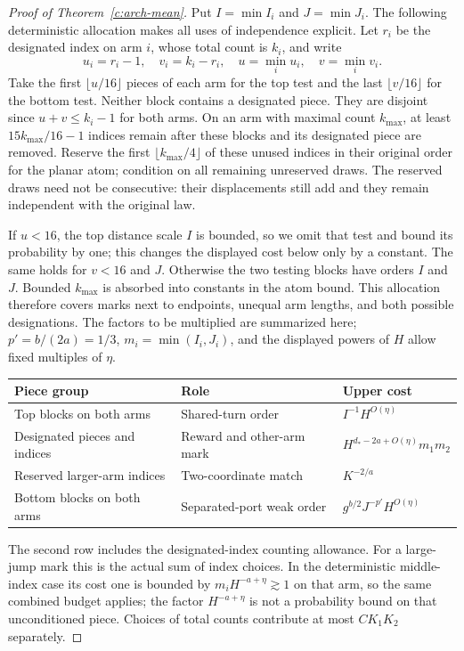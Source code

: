 \documentclass[11pt]{article}
\numberwithin{equation}{section}
\theoremstyle{definition}\newtheorem{definition}[theorem]{Definition}
\theoremstyle{remark}\newtheorem{remark}[theorem]{Remark}
\begin{document}
\begin{proof}[Proof of Theorem~\ref{c:arch-mean}]
Put $I=\min I_i$ and $J=\min J_i$. The following deterministic allocation makes all uses of independence explicit. Let $r_i$ be the designated index on arm $i$, whose total count is $k_i$, and write
\[
 u_i=r_i-1,\quad v_i=k_i-r_i,\quad
 u=\min_i u_i,\quad v=\min_i v_i.
\]
Take the first $\lfloor u/16\rfloor$ pieces of each arm for the top test and the last $\lfloor v/16\rfloor$ for the bottom test. Neither block contains a designated piece. They are disjoint since $u+v\le k_i-1$ for both arms. On an arm with maximal count $k_{\max}$, at least $15k_{\max}/16-1$ indices remain after these blocks and its designated piece are removed. Reserve the first $\lfloor k_{\max}/4\rfloor$ of these unused indices in their original order for the planar atom; condition on all remaining unreserved draws. The reserved draws need not be consecutive: their displacements still add and they remain independent with the original law.

If $u<16$, the top distance scale $I$ is bounded, so we omit that test and bound its probability by one; this changes the displayed cost below only by a constant. The same holds for $v<16$ and $J$. Otherwise the two testing blocks have orders $I$ and $J$. Bounded $k_{\max}$ is absorbed into constants in the atom bound. This allocation therefore covers marks next to endpoints, unequal arm lengths, and both possible designations. The factors to be multiplied are summarized here; $p'=b/(2a)=1/3$, $m_i=\min(I_i,J_i)$, and the displayed powers of $H$ allow fixed multiples of $\eta$.
\begin{center}
\begin{tabular}{@{}lll@{}}
\toprule
Piece group & Role & Upper cost \\
\midrule
Top blocks on both arms & Shared-turn order & $I^{-1}H^{O(\eta)}$ \\
Designated pieces and indices & Reward and other-arm mark & $H^{d_*-2a+O(\eta)}m_1m_2$ \\
Reserved larger-arm indices & Two-coordinate match & $K^{-2/a}$ \\
Bottom blocks on both arms & Separated-port weak order & $g^{b/2}J^{-p'}H^{O(\eta)}$ \\
\bottomrule
\end{tabular}
\end{center}
The second row includes the designated-index counting allowance. For a large-jump mark this is the actual sum of index choices. In the deterministic middle-index case its cost one is bounded by $m_iH^{-a+\eta}\gtrsim1$ on that arm, so the same combined budget applies; the factor $H^{-a+\eta}$ is not a probability bound on that unconditioned piece. Choices of total counts contribute at most $CK_1K_2$ separately.


\end{proof}
\end{document}

